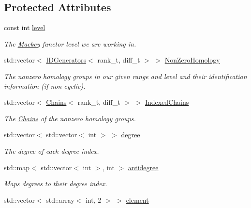 \subsection*{Protected Attributes}
\begin{DoxyCompactItemize}
\item 
const int \hyperlink{classMackey_1_1TableInput_afa9c0057ffdcded31253a9f5dfbeaa2d}{level}
\begin{DoxyCompactList}\small\item\em The \hyperlink{namespaceMackey}{Mackey} functor level we are working in. \end{DoxyCompactList}\item 
std\+::vector$<$ \hyperlink{classMackey_1_1IDGenerators}{I\+D\+Generators}$<$ rank\+\_\+t, diff\+\_\+t $>$ $>$ \hyperlink{classMackey_1_1TableInput_a337fa51024c06d4f9085d8bf00b6001c}{Non\+Zero\+Homology}
\begin{DoxyCompactList}\small\item\em The nonzero homology groups in our given range and level and their identification information (if non cyclic). \end{DoxyCompactList}\item 
std\+::vector$<$ \hyperlink{classMackey_1_1Chains}{Chains}$<$ rank\+\_\+t, diff\+\_\+t $>$ $>$ \hyperlink{classMackey_1_1TableInput_aa612b7b41454848c19d3192ab6211ee4}{Indexed\+Chains}
\begin{DoxyCompactList}\small\item\em The \hyperlink{classMackey_1_1Chains}{Chains} of the nonzero homology groups. \end{DoxyCompactList}\item 
std\+::vector$<$ std\+::vector$<$ int $>$ $>$ \hyperlink{classMackey_1_1TableInput_a71c70914bfbaf0bbdd2d9f78a33d7a37}{degree}
\begin{DoxyCompactList}\small\item\em The degree of each degree index. \end{DoxyCompactList}\item 
std\+::map$<$ std\+::vector$<$ int $>$, int $>$ \hyperlink{classMackey_1_1TableInput_a0eef9eba4856780865fba0abe32057e7}{antidegree}
\begin{DoxyCompactList}\small\item\em Maps degrees to their degree index. \end{DoxyCompactList}\item 
std\+::vector$<$ std\+::array$<$ int, 2 $>$ $>$ \hyperlink{classMackey_1_1TableInput_a17b8785e7e6edb9b20f8a4f5b2421db7}{element}

\end{DoxyCompactItemize}

